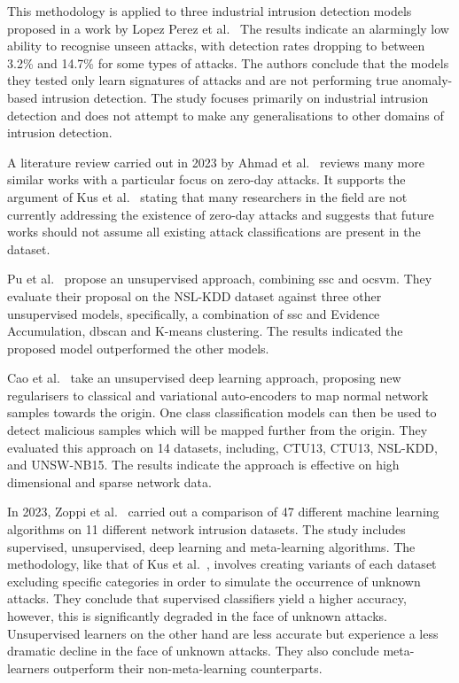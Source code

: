 This methodology is applied to three industrial intrusion detection models
proposed in a work by Lopez Perez et al.~\cite{Perez} The results indicate an
alarmingly low ability to recognise unseen attacks, with detection rates
dropping to between 3.2\% and 14.7\% for some types of attacks. The authors
conclude that the models they tested only learn signatures of attacks and are
not performing true anomaly-based intrusion detection. The study focuses
primarily on industrial intrusion detection and does not attempt to make any
generalisations to other domains of intrusion detection.

A literature review carried out in 2023 by Ahmad et al.~\cite{zero-day} reviews
many more similar works with a particular focus on zero-day attacks. It
supports the argument of Kus et al.~\cite{Kus} stating that many researchers in
the field are not currently addressing the existence of zero-day attacks and
suggests that future works should not assume all existing attack
classifications are present in the dataset.

Pu et al.~\cite{Pu} propose an unsupervised approach, combining \gls{ssc} and
\gls{ocsvm}. They evaluate their proposal on the NSL-KDD dataset against three
other unsupervised models, specifically, a combination of \gls{ssc} and
Evidence Accumulation, \gls{dbscan} and K-means clustering. The results
indicated the proposed model outperformed the other models.

Cao et al.~\cite{Cao} take an unsupervised deep learning approach, proposing
new regularisers to classical and variational auto-encoders to map normal
network samples towards the origin. One class classification models can then be
used to detect malicious samples which will be mapped further from the origin.
They evaluated this approach on 14 datasets, including, CTU13, CTU13,
NSL-KDD, and UNSW-NB15. The results indicate the approach is effective on high
dimensional and sparse network data.

In 2023, Zoppi et al.~\cite{Zoppi} carried out a comparison of 47 different
machine learning algorithms on 11 different network intrusion datasets. The
study includes supervised, unsupervised, deep learning and meta-learning
algorithms. The methodology, like that of Kus et al.~\cite{Kus}, involves
creating variants of each dataset excluding specific categories in order to
simulate the occurrence of unknown attacks. They conclude that supervised
classifiers yield a higher accuracy, however, this is significantly degraded in
the face of unknown attacks. Unsupervised learners on the other hand are less
accurate but experience a less dramatic decline in the face of unknown attacks.
They also conclude meta-learners outperform their non-meta-learning
counterparts.

